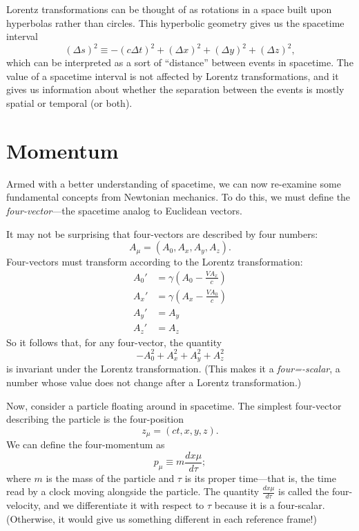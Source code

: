 \documentclass[../p023main.tex]{subfiles}
\begin{document}
\begin{summary}
    Lorentz transformations can be thought of as rotations in a space built upon hyperbolas rather than circles.
    This hyperbolic geometry gives us the spacetime interval
    \[ (\Delta s)^2 \equiv -(c \Delta t)^2 + (\Delta x)^2 + (\Delta y)^2 + (\Delta z)^2, \]
    which can be interpreted as a sort of ``distance'' between events in spacetime.
    The value of a spacetime interval is not affected by Lorentz transformations, and it gives us information about whether the separation between the events is mostly spatial or temporal (or both).
\end{summary}


\section{Momentum}
Armed with a better understanding of spacetime, we can now re-examine some fundamental concepts from Newtonian mechanics.
To do this, we must define the \textit{four-vector}---the spacetime analog to Euclidean vectors.

It may not be surprising that four-vectors are described by four numbers:
\[ A_\mu = (A_0, A_x, A_y, A_z). \]
Four-vectors must transform according to the Lorentz transformation:
\begin{align*}
    A_0' &= \gamma \left( A_0 - \frac{VA_x}{c} \right) \\
    A_x' &= \gamma \left( A_x - \frac{VA_0}{c} \right) \\
    A_y' &= A_y \\
    A_z' &= A_z
\end{align*}
So it follows that, for any four-vector, the quantity
\[ -A_0^2 + A_x^2 + A_y^2 + A_z^2 \]
is invariant under the Lorentz transformation.
(This makes it a \textit{four=-scalar}, a number whose value does not change after a Lorentz transformation.)

Now, consider a particle floating around in spacetime.
The simplest four-vector describing the particle is the four-position
\[ z_\mu = (ct, x, y, z). \]
We can define the four-momentum as
\[ p_\mu \equiv m \frac{dx\mu}{d\tau}; \]
where $m$ is the mass of the particle and $\tau$ is its proper time---that is, the time read by a clock moving alongside the particle.
The quantity $\frac{dx\mu}{d\tau}$ is called the four-velocity, and we differentiate it with respect to $\tau$ because it is a four-scalar.
(Otherwise, it would give us something different in each reference frame!)
\end{document}
